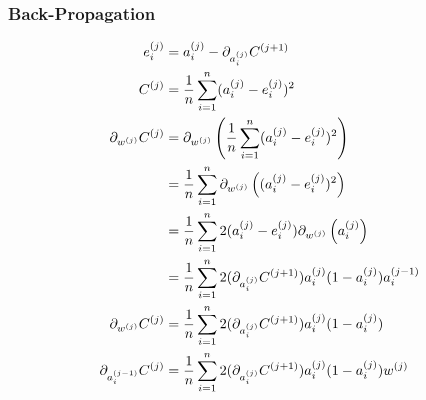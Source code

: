 \documentclass{article}
\begin{document}
\subsubsection{Back-Propagation}

\begin{align}
  e_{i}^{(j)} &= a_{i}^{(j)} - \pd[a_{i}^{(j)}] C^{(j+1)} \\
  C^{(j)} &= \avgsum[i, n] (a_{i}^{(j)} - e_{i}^{(j)})^{2} \\
  \pd[w^{(j)}] C^{(j)} &= \pd[w^{(j)}] \left( \avgsum[i, n] (a_{i}^{(j)} - e_{i}^{(j)})^{2} \right) \\
                       &= \avgsum[i, n] \pd[w^{(j)}] \left( (a_{i}^{(j)} - e_{i}^{(j)})^{2} \right) \\
                       &= \avgsum[i, n] 2 (a_{i}^{(j)} - e_{i}^{(j)}) \pd[w^{(j)}] \left( a_{i}^{(j)} \right) \\
                       &= \avgsum[i, n] 2 (\pd[a_{i}^{(j)}] C^{(j+1)}) a_{i}^{(j)} (1 - a_{i}^{(j)}) a_{i}^{(j-1)} \\
  \pd[w^{(j)}] C^{(j)} &= \avgsum[i, n] 2 (\pd[a_{i}^{(j)}] C^{(j+1)}) a_{i}^{(j)} (1 - a_{i}^{(j)}) \\
  \pd[a_{i}^{(j-1)}] C^{(j)} &= \avgsum[i, n] 2 (\pd[a_{i}^{(j)}] C^{(j+1)}) a_{i}^{(j)} (1 - a_{i}^{(j)}) w^{(j)}
\end{align}
\end{document}
